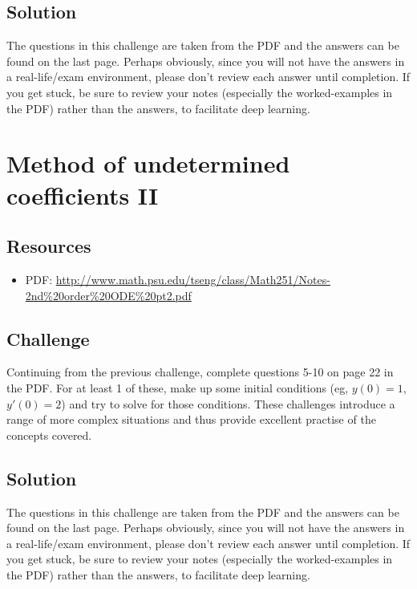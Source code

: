 \subsection*{Solution}
The questions in this challenge are taken from the PDF and the answers can be found on the last page. Perhaps obviously, since you will not have the answers in a real-life/exam environment, please don't review each answer until completion. If you get stuck, be sure to review your notes (especially the worked-examples in the PDF) rather than the answers, to facilitate deep learning. 

\timebox




\newpage
\section{Method of undetermined coefficients II}

\subsection*{Resources}
\begin{itemize}
    \item PDF: \url{http://www.math.psu.edu/tseng/class/Math251/Notes-2nd\%20order\%20ODE\%20pt2.pdf}
\end{itemize}

\subsection*{Challenge}
Continuing from the previous challenge, complete questions 5-10 on page 22 in the PDF. For at least 1 of these, make up some initial conditions (eg, $y(0)=1$, $y'(0)=2$) and try to solve for those conditions. These challenges introduce a range of more complex situations and thus provide excellent practise of the concepts covered. 

\subsection*{Solution}
The questions in this challenge are taken from the PDF and the answers can be found on the last page. Perhaps obviously, since you will not have the answers in a real-life/exam environment, please don't review each answer until completion. If you get stuck, be sure to review your notes (especially the worked-examples in the PDF) rather than the answers, to facilitate deep learning. 

